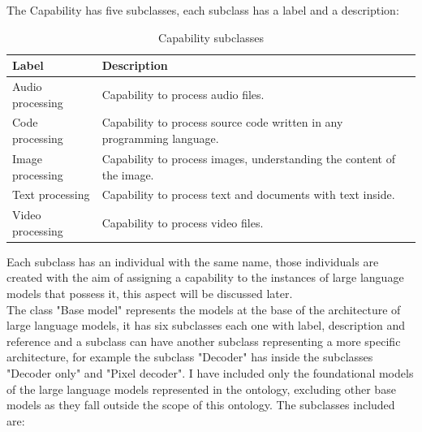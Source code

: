 The Capability has five subclasses, each subclass has a label and a description:
\begin{table}[H]
    \centering
    \begin{tabular}{|>{\raggedright\arraybackslash}p{6cm}|>{\raggedright\arraybackslash}p{6cm}|}
        \hline
        \textbf{Label} & \textbf{Description} \\ \hline
         Audio processing &  Capability to process audio files. \\ \hline
         
         Code processing & Capability to process source code written in any programming language. \\ \hline
         
         Image processing & Capability to process images, understanding the content of the image. \\ \hline
         
         Text processing & Capability to process text and documents with text inside. \\ \hline
         
         Video processing & Capability to process video files. \\ \hline
    \end{tabular}
    \caption{Capability subclasses}
\end{table}
Each subclass has an individual with the same name, those individuals are created with the aim of assigning a capability to the instances of large language models that possess it, this aspect will be discussed later.\\
The class "Base model" represents the models at the base of the architecture of large language models, it has six subclasses each one with label, description and reference and a subclass can have another subclass representing a more specific architecture, for example the subclass "Decoder" has inside the subclasses "Decoder only" and "Pixel decoder". 
I have included only the foundational models of the large language models represented in the ontology, excluding other base models as they fall outside the scope of this ontology. The subclasses included are: 
